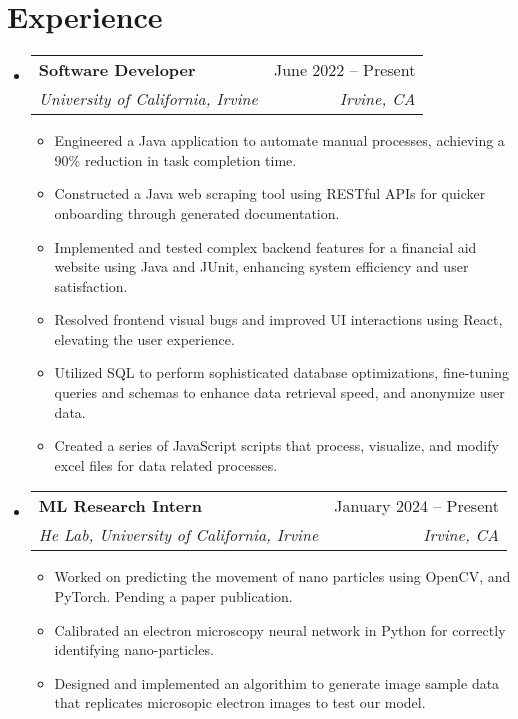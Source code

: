 \documentclass[letterpaper,11pt]{article}
\makeatletter
\newcommand{\resumeItem}[1]{
  \item\small{
    {#1 \vspace{-2pt}}
  }
}
\newcommand{\resumeSubheading}[4]{
  \vspace{-2pt}\item
    \begin{tabular*}{0.97\textwidth}[t]{l@{\extracolsep{\fill}}r}
      \textbf{#1} & #2 \\
      \textit{\small#3} & \textit{\small #4} \\
    \end{tabular*}\vspace{-7pt}
}
\newcommand{\resumeSubSubheading}[2]{
    \item
    \begin{tabular*}{0.97\textwidth}{l@{\extracolsep{\fill}}r}
      \textit{\small#1} & \textit{\small #2} \\
    \end{tabular*}\vspace{-7pt}
}
\newcommand{\resumeSubHeadingListStart}{\begin{itemize}[leftmargin=0.15in, label={}]}
\newcommand{\resumeSubHeadingListEnd}{\end{itemize}}
\newcommand{\resumeItemListStart}{\begin{itemize}}
\newcommand{\resumeItemListEnd}{\end{itemize}\vspace{-5pt}}
\makeatother
\begin{document}
\section{Experience}
  \resumeSubHeadingListStart

    \resumeSubheading
      {Software Developer}{June 2022 -- Present}
      {University of California, Irvine}{Irvine, CA}
      \resumeItemListStart
        \resumeItem{Engineered a Java application to automate manual processes, achieving a 90\% reduction in task completion time.}
        \resumeItem{Constructed a Java web scraping tool using RESTful APIs for quicker onboarding through generated documentation.
        }
        \resumeItem{Implemented and tested complex backend features for a financial aid website using Java and JUnit, enhancing system efficiency and user satisfaction.
        }
        \resumeItem{Resolved frontend visual bugs and improved UI interactions using React, elevating the user experience. 
        }
        \resumeItem{Utilized SQL to perform sophisticated database optimizations, fine-tuning queries and schemas to enhance data retrieval speed, and anonymize user data.
        }
        \resumeItem{Created a series of JavaScript scripts that process, visualize, and modify excel files for data related processes.}
      \resumeItemListEnd
    \resumeSubheading
      {ML Research Intern}{January 2024 -- Present}
      {He Lab, University of California, Irvine}{Irvine, CA}
      \resumeItemListStart
        \resumeItem{Worked on predicting the movement of nano particles using OpenCV, and PyTorch. Pending a paper publication.}
        \resumeItem{Calibrated an electron microscopy neural network in Python for correctly identifying nano-particles.
        }
        \resumeItem{Designed and implemented an algorithim to generate image sample data that replicates microsopic electron images to test our model. 
        }
      \resumeItemListEnd
      

  \resumeSubHeadingListEnd


\end{document}
